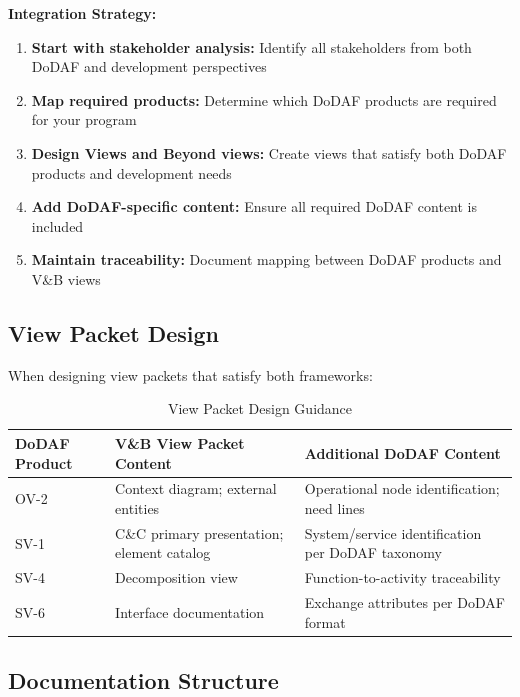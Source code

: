 \documentclass[11pt]{article}
\begin{document}
\begin{bestpractice}
\textbf{Integration Strategy:}

\begin{enumerate}
    \item \textbf{Start with stakeholder analysis:} Identify all stakeholders from both DoDAF and development perspectives

    \item \textbf{Map required products:} Determine which DoDAF products are required for your program

    \item \textbf{Design Views and Beyond views:} Create views that satisfy both DoDAF products and development needs

    \item \textbf{Add DoDAF-specific content:} Ensure all required DoDAF content is included

    \item \textbf{Maintain traceability:} Document mapping between DoDAF products and V\&B views
\end{enumerate}
\end{bestpractice}

\subsection{View Packet Design}

When designing view packets that satisfy both frameworks:

\begin{longtable}{@{}L{2.5cm} L{4cm} L{6cm}@{}}
\caption{View Packet Design Guidance} \\
\toprule
\textbf{DoDAF Product} & \textbf{V\&B View Packet Content} & \textbf{Additional DoDAF Content} \\
\midrule
\endfirsthead
\bottomrule
\endlastfoot
OV-2 & Context diagram; external entities & Operational node identification; need lines \\
SV-1 & C\&C primary presentation; element catalog & System/service identification per DoDAF taxonomy \\
SV-4 & Decomposition view & Function-to-activity traceability \\
SV-6 & Interface documentation & Exchange attributes per DoDAF format \\
\end{longtable}

\subsection{Documentation Structure}
\end{document}
